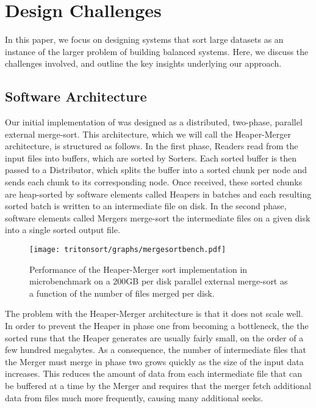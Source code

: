 \section{Design Challenges}
\label{tritonsort:sec:challenges}

In this paper, we focus on designing systems that sort large datasets as an
instance of the larger problem of building balanced systems.  Here, we discuss
the challenges involved, and outline the key insights underlying our approach.

\subsection{Software Architecture}

Our initial implementation of \tritonsort was designed as a distributed,
two-phase, parallel external merge-sort.  This architecture, which we will call
the Heaper-Merger architecture, is structured as follows.  In the first phase,
Readers read from the input files into buffers, which are sorted by Sorters.
Each sorted buffer is then passed to a Distributor, which splits the buffer
into a sorted chunk per node and sends each chunk to its corresponding node.
Once received, these sorted chunks are heap-sorted by software elements called
Heapers in batches and each resulting sorted batch is written to an
intermediate file on disk.  In the second phase, software elements called
Mergers merge-sort the intermediate files on a given disk into a single sorted
output file.

\begin{figure}
 \centering
 \texttt{[image: tritonsort/graphs/mergesortbench.pdf]}
 \caption{\label{fig:mergesort}Performance of the Heaper-Merger sort
   implementation in microbenchmark on a 200GB per disk parallel external merge-sort as a function of the number of files merged per disk.}
\end{figure}

The problem with the Heaper-Merger architecture is that it does not scale well.
In order to prevent the Heaper in phase one from becoming a bottleneck, the the
sorted runs that the Heaper generates are usually fairly small, on the order of
a few hundred megabytes. As a consequence, the number of intermediate files
that the Merger must merge in phase two grows quickly as the size of the input
data increases. This reduces the amount of data from each intermediate file
that can be buffered at a time by the Merger and requires that the merger fetch
additional data from files much more frequently, causing many additional seeks.


